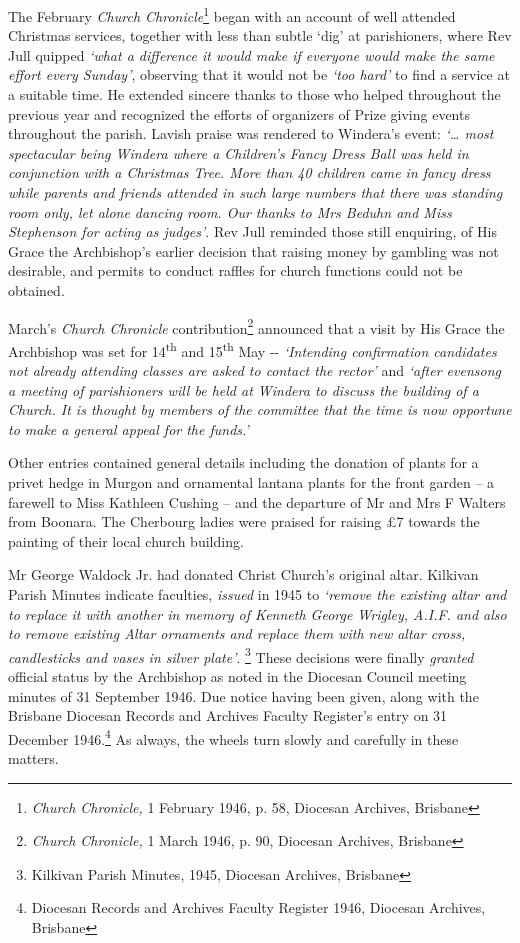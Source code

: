 The February \emph{Church Chronicle}\footnote{\emph{Church Chronicle,} 1 February 1946, p. 58, Diocesan Archives, Brisbane} began with an account of well attended Christmas services, together with less than subtle `dig' at parishioners, where Rev Jull quipped \emph{`what a difference it would make if everyone would make the same effort every Sunday'}, observing that it would not be \emph{`too hard'} to find a service at a suitable time. He extended sincere thanks to those who helped throughout the previous year and recognized the efforts of organizers of Prize giving events throughout the parish. Lavish praise was rendered to Windera's event: \emph{`\ldots{} most spectacular being Windera where a Children's Fancy Dress Ball was held in conjunction with a Christmas Tree. More than 40 children came in fancy dress while parents and friends attended in such large numbers that there was standing room only, let alone dancing room. Our thanks to Mrs Beduhn and Miss Stephenson for acting as judges'}. Rev Jull reminded those still enquiring, of His Grace the Archbishop's earlier decision that raising money by gambling was not desirable, and permits to conduct raffles for church functions could not be obtained.


March's \emph{Church Chronicle} contribution\footnote{\emph{Church Chronicle,} 1 March 1946, p. 90, Diocesan Archives, Brisbane} announced that a visit by His Grace the Archbishop was set for 14\textsuperscript{th} and 15\textsuperscript{th} May -\/- \emph{`Intending confirmation candidates not already attending classes are asked to contact the rector'} and \emph{`after evensong a meeting of parishioners will be held at Windera to discuss the building of a Church. It is thought by members of the committee that the time is now opportune to make a general appeal for the funds.'}


Other entries contained general details including the donation of plants for a privet hedge in Murgon and ornamental lantana plants for the front garden -- a farewell to Miss Kathleen Cushing -- and the departure of Mr and Mrs F Walters from Boonara. The Cherbourg ladies were praised for raising \pounds7 towards the painting of their local church building.



Mr George Waldock Jr. had donated Christ Church's original altar. Kilkivan Parish Minutes indicate faculties, \emph{issued} in 1945 to \emph{`remove the existing altar and to replace it with another in memory of Kenneth George Wrigley, A.I.F. and also to remove existing Altar ornaments and replace them with new altar cross, candlesticks and vases in silver plate'}. \footnote{Kilkivan Parish Minutes, 1945, Diocesan Archives, Brisbane} These decisions were finally \emph{granted} official status by the Archbishop as noted in the Diocesan Council meeting minutes of 31 September 1946. Due notice having been given, along with the Brisbane Diocesan Records and Archives Faculty Register's entry on 31 December 1946.\footnote{Diocesan Records and Archives Faculty Register 1946, Diocesan Archives, Brisbane} As always, the wheels turn slowly and carefully in these matters.


